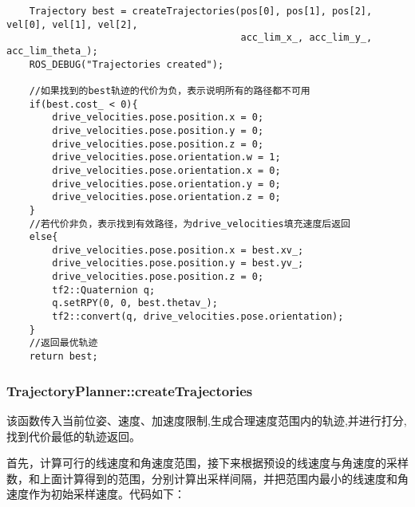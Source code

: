 \documentclass[9pt, oneside]{book}
\begin{document}
\footnotesize
\begin{verbatim}
    Trajectory best = createTrajectories(pos[0], pos[1], pos[2], vel[0], vel[1], vel[2],
                                         acc_lim_x_, acc_lim_y_, acc_lim_theta_);
    ROS_DEBUG("Trajectories created");

    //如果找到的best轨迹的代价为负，表示说明所有的路径都不可用
    if(best.cost_ < 0){
        drive_velocities.pose.position.x = 0;
        drive_velocities.pose.position.y = 0;
        drive_velocities.pose.position.z = 0;
        drive_velocities.pose.orientation.w = 1;
        drive_velocities.pose.orientation.x = 0;
        drive_velocities.pose.orientation.y = 0;
        drive_velocities.pose.orientation.z = 0;
    }
    //若代价非负，表示找到有效路径，为drive_velocities填充速度后返回
    else{
        drive_velocities.pose.position.x = best.xv_;
        drive_velocities.pose.position.y = best.yv_;
        drive_velocities.pose.position.z = 0;
        tf2::Quaternion q;
        q.setRPY(0, 0, best.thetav_);
        tf2::convert(q, drive_velocities.pose.orientation);
    }
    //返回最优轨迹
    return best;
\end{verbatim}
\normalsize

\subsubsection{TrajectoryPlanner::createTrajectories}

该函数传入当前位姿、速度、加速度限制,生成合理速度范围内的轨迹,并进行打分,找到代价最低的轨迹返回。

首先，计算可行的线速度和角速度范围，接下来根据预设的线速度与角速度的采样数，和上面计算得到的范围，分别计算出采样间隔，并把范围内最小的线速度和角速度作为初始采样速度。代码如下：
\end{document}

